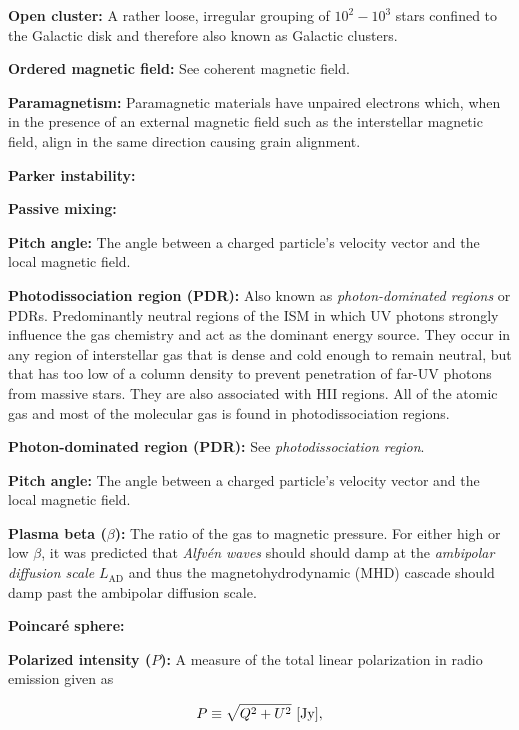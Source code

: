 \documentclass[a4paper,11pt]{article}
\begin{document}
{\noindent}\textbf{Open cluster:} A rather loose, irregular grouping of $10^2-10^3$ stars confined to the Galactic disk and therefore also known as Galactic clusters. 

{\noindent}\textbf{Ordered magnetic field:} See coherent magnetic field.

{\noindent}\textbf{Paramagnetism:} Paramagnetic materials have unpaired electrons which, when in the presence of an external magnetic field such as the interstellar magnetic field, align in the same direction causing grain alignment.

{\noindent}\textbf{Parker instability:}

{\noindent}\textbf{Passive mixing:}

{\noindent}\textbf{Pitch angle:} The angle between a charged particle's velocity vector and the local magnetic field.

{\noindent}\textbf{Photodissociation region (PDR):} Also known as \textit{photon-dominated regions} or PDRs. Predominantly neutral regions of the ISM in which UV photons strongly influence the gas chemistry and act as the dominant energy source. They occur in any region of interstellar gas that is dense and cold enough to remain neutral, but that has too low of a column density to prevent penetration of far-UV photons from massive stars. They are also associated with HII regions. All of the atomic gas and most of the molecular gas is found in photodissociation regions.

{\noindent}\textbf{Photon-dominated region (PDR):} See \textit{photodissociation region}.

{\noindent}\textbf{Pitch angle:} The angle between a charged particle's velocity vector and the local magnetic field.

{\noindent}\textbf{Plasma beta ($\beta$):} The ratio of the gas to magnetic pressure. For either high or low $\beta$, it was predicted that \textit{Alfv\'en waves} should should damp at the \textit{ambipolar diffusion scale} $L_\mathrm{AD}$ and thus the magnetohydrodynamic (MHD) cascade should damp past the ambipolar diffusion scale.

{\noindent}\textbf{Poincaré sphere:}

{\noindent}\textbf{Polarized intensity ($P$):} A measure of the total linear polarization in radio emission given as

\begin{align*}
    P\equiv\sqrt{Q^2+U^2} ~ [{\rm Jy}],
\end{align*}
\end{document}
